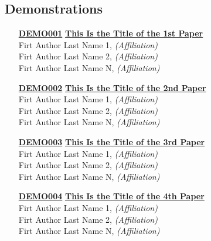 \subsection{Demonstrations}
\begin{enumerate}
\item[\href{https://doi.org/10.1145/1122445.1122456}{\textbf{DEMO001}}]
\href{https://doi.org/10.1145/1122445.1122456}{\textbf{This Is the Title of the 1st Paper}}\\
Firt Author Last Name 1, \emph{(Affiliation)}\\
Firt Author Last Name 2, \emph{(Affiliation)}\\
Firt Author Last Name N, \emph{(Affiliation)}\\

\item[\href{https://doi.org/10.1145/1122445.1122456}{\textbf{DEMO002}}]
\href{https://doi.org/10.1145/1122445.1122456}{\textbf{This Is the Title of the 2nd Paper}}\\
Firt Author Last Name 1, \emph{(Affiliation)}\\
Firt Author Last Name 2, \emph{(Affiliation)}\\
Firt Author Last Name N, \emph{(Affiliation)}\\

\item[\href{https://doi.org/10.1145/1122445.1122456}{\textbf{DEMO003}}]
\href{https://doi.org/10.1145/1122445.1122456}{\textbf{This Is the Title of the 3rd Paper}}\\
Firt Author Last Name 1, \emph{(Affiliation)}\\
Firt Author Last Name 2, \emph{(Affiliation)}\\
Firt Author Last Name N, \emph{(Affiliation)}\\

\item[\href{https://doi.org/10.1145/1122445.1122456}{\textbf{DEMO004}}]
\href{https://doi.org/10.1145/1122445.1122456}{\textbf{This Is the Title of the 4th Paper}}\\
Firt Author Last Name 1, \emph{(Affiliation)}\\
Firt Author Last Name 2, \emph{(Affiliation)}\\
Firt Author Last Name N, \emph{(Affiliation)}\\
\end{enumerate}


